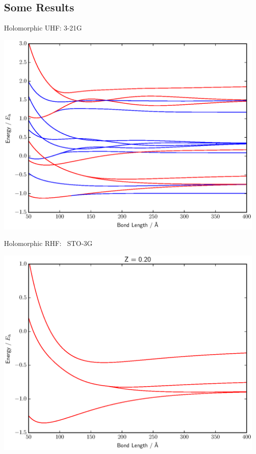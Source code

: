 \documentclass{beamer}
\begin{document}
\subsection{Some Results}
\begin{frame}{Holomorphic UHF:  3-21G}
\vspace{-0.9em}
  \begin{center}
    \includegraphics[scale=0.45]{BFGS_UHF_HH_3-21g}
  \end{center}
\end{frame}

\begin{frame}{Holomorphic RHF: \ STO-3G}
\vspace{-0.9em}
  \begin{center}
    \includegraphics[scale=0.45]{BFGS_RHF_HZ_0-20_sto-3g}
  \end{center}
\end{frame}
\end{document}
